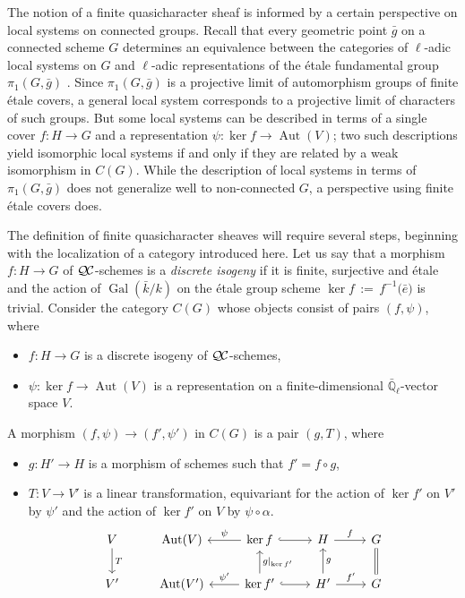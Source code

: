 \documentclass{amsart}
\theoremstyle{plain}
\theoremstyle{definition}
\theoremstyle{remark}
\newcommand{\EE}{\mathbb{\bar Q}_\ell}
\newcommand{\bFq}{\bar{k}}
\newcommand{\Fq}{k}
\DeclareMathOperator{\Gal}{Gal}
\DeclareMathOperator{\Aut}{Aut}
\newcommand{\ceq}{{\, :=\, }}
\newcommand{\QC}{{\mathcal{Q\hskip-0.8pt C}}}
\newcommand{\bg}{\bar{g}}
\begin{document}
The notion of a finite quasicharacter sheaf is informed 
by a certain perspective on local systems on connected groups.
Recall that every geometric point $\bg$ on a connected scheme $G$ 
determines an equivalence between the categories of $\ell$-adic local systems on $G$ 
and $\ell$-adic representations of the \'etale fundamental group $\pi_1(G, \bg)$ 
.
 Since $\pi_1(G, \bg)$ is a projective limit of automorphism groups of finite \'etale covers, 
 a general local system corresponds to a projective limit of characters of such groups.  
 But some local systems can be described in terms of a single cover $f: H \to G$ 
 and a representation $\psi: \ker f \to \Aut(V)$;
 two such descriptions yield isomorphic local systems if and only if they are related by a weak
 isomorphism in $C(G)$.  While the description of local systems in terms of $\pi_1(G, \bg)$ does
 not generalize well to non-connected $G$, a perspective using finite \'etale covers does.

The definition of finite quasicharacter sheaves will require several steps, 
beginning with the localization of a category introduced here.
Let us say that a morphism $f : H\to G$ of $\QC$-schemes is a \emph{discrete isogeny}
if it is finite, surjective and \'etale and the action of $\Gal(\bFq/\Fq)$ on the \'etale group
scheme $\ker f \ceq f^{-1}({\bar e)}$ is trivial.
Consider the category $C(G)$ whose objects consist of pairs $(f,\psi)$, where
\begin{itemize}
\item $f : H\to G$ is a discrete isogeny of $\QC$-schemes,
\item $\psi : \ker f\to \Aut(V)$ is a representation on a finite-dimensional $\EE$-vector space $V$.
\end{itemize}
A morphism $(f,\psi) \to (f',\psi')$ in $C(G)$ is a pair $(g,T)$, where
\begin{itemize}
\item $g : H' \to H$ is a morphism of schemes such that $f' = f\circ g$,
\item $T : V\to V'$ is a linear transformation, equivariant for the action of
$\ker f'$ on $V'$ by $\psi'$ and the action of $\ker f'$ on $V$ by $\psi \circ \alpha$.
\[
\begin{tikzcd}
V \arrow{d}{T} & \Aut(V) & \arrow[swap]{l}{\psi} \ker f \arrow[hook]{r} & H \arrow{r}{f} & \arrow[equal]{d} G\\
V' & \Aut(V') & \arrow[swap]{l}{\psi'} \arrow[swap]{u}{g\vert_{\ker f'}} \ker f' \arrow[hook]{r} & \arrow[swap]{u}{g} H' \arrow{r}{f'} & G
\end{tikzcd}
\]
\end{itemize}
\end{document}
